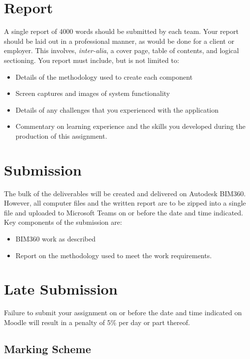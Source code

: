 \newpage
\section*{Report}
A single report of 4000 words should be submitted by each team.  Your report should be laid out in a professional manner, as would be done for a client or employer.  This involves, \emph{inter-alia}, a cover page, table of contents, and logical sectioning.  You report must include, but is not limited to:
\begin{itemize}
	\item Details of the methodology used to create each component
	\item Screen captures and images of system functionality
	\item Details of any challenges that you experienced with the application
	\item Commentary on learning experience and the skills you developed during the production of this assignment.
\end{itemize}
  


\section*{Submission}
The bulk of the deliverables will be created and delivered on Autodesk BIM360.  However, all computer files and the written report are to be zipped into a single file and uploaded to Microsoft Teams on or before the date and time indicated.  Key components of the submission are:

\begin{itemize}
	\item BIM360 work as described
	\item Report on the methodology used to meet the work requirements.  
\end{itemize}



\section*{Late Submission}
Failure to submit your assignment on or before the date and time indicated on Moodle will result in a penalty of 5\% per day or part thereof.

\subsection*{Marking Scheme}

